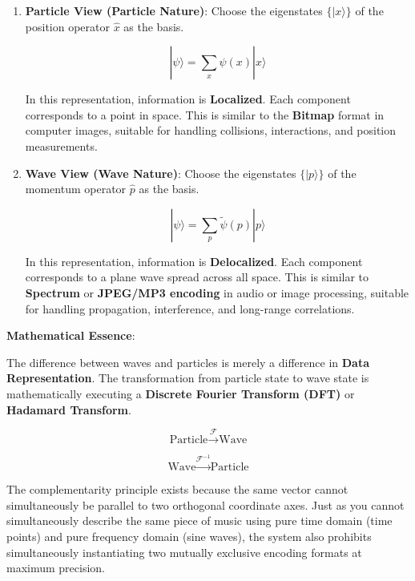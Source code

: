 \begin{enumerate}
\item \textbf{Particle View (Particle Nature)}: Choose the eigenstates $\{|x\rangle\}$ of the position operator $\hat{x}$ as the basis.

    \begin{equation}
    |\psi\rangle = \sum_x \psi(x) |x\rangle
    \end{equation}

    In this representation, information is \textbf{Localized}. Each component corresponds to a point in space. This is similar to the \textbf{Bitmap} format in computer images, suitable for handling collisions, interactions, and position measurements.

\item \textbf{Wave View (Wave Nature)}: Choose the eigenstates $\{|p\rangle\}$ of the momentum operator $\hat{p}$ as the basis.

    \begin{equation}
    |\psi\rangle = \sum_p \tilde{\psi}(p) |p\rangle
    \end{equation}

    In this representation, information is \textbf{Delocalized}. Each component corresponds to a plane wave spread across all space. This is similar to \textbf{Spectrum} or \textbf{JPEG/MP3 encoding} in audio or image processing, suitable for handling propagation, interference, and long-range correlations.
\end{enumerate}

\textbf{Mathematical Essence}:

The difference between waves and particles is merely a difference in \textbf{Data Representation}. The transformation from particle state to wave state is mathematically executing a \textbf{Discrete Fourier Transform (DFT)} or \textbf{Hadamard Transform}.

$$\text{Particle} \xrightarrow{\mathcal{F}} \text{Wave}$$

$$\text{Wave} \xrightarrow{\mathcal{F}^{-1}} \text{Particle}$$

The complementarity principle exists because the same vector cannot simultaneously be parallel to two orthogonal coordinate axes. Just as you cannot simultaneously describe the same piece of music using pure time domain (time points) and pure frequency domain (sine waves), the system also prohibits simultaneously instantiating two mutually exclusive encoding formats at maximum precision.

